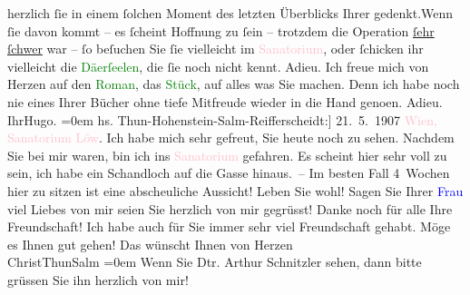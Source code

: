                herzlich ſie in einem ſolchen Moment des letzten Überblicks Ihrer gedenkt.\hspace*{1.5em}Wenn ſie davon kommt – es {\pb}ſcheint Hoffnung zu ſein –
               trotzdem die Operation \uline{ſehr}{ }\uline{ſchwer} war – ſo beſuchen Sie ſie
               vielleicht im \textcolor{pink}{Sanatorium}{}, oder
               ſchicken ihr vielleicht die \textcolor{green}{Dä{\geminationm}erſeelen}{}\ledrightnote{\textcolor{green}{Dämmerseelen. Novellen}}, die ſie noch nicht kennt.\pend
           \pstart
           Adieu. Ich freue mich von Herzen auf den \textcolor{green}{Roman}{}, das \textcolor{green}{Stück}{}, auf
               alles was Sie machen. {\pb}Denn ich
               habe noch nie eines Ihrer Bücher ohne tiefe Mitfreude wieder in die Hand geno{\geminationm}en.\pend
           \pstart
           Adieu.{\\[\baselineskip]}Ihr\spacefill\mbox{Hugo.}\pend
           \leftskip=0em{}{\bigskip}\pstart
           \raggedleft{}{\pb}{[}hs. Thun-Hohenstein-Salm-Reifferscheidt:{]} 21. 5. 1907\pend
           \pstart
           \raggedleft{}\textcolor{pink}{Wien, Sanatorium Löw}{}\ledrightnote{\textcolor{pink}{Sanatorium Loew}}.\pend
           \pstart
           Ich habe mich sehr gefreut, Sie heute noch zu sehen. Nachdem Sie bei mir waren, bin
               ich ins \textcolor{pink}{Sanatorium}{} gefahren. Es
               scheint hier sehr voll zu sein, {\kaufmannsund} ich habe ein
               Schandloch auf die Gasse hinaus. –\pend
           \pstart
           Im besten Fall 4 Wochen hier zu sitzen ist eine abscheuliche Aussicht!\pend
           \pstart
           Leben Sie wohl! Sagen Sie Ihrer \textcolor{blue}{Frau}{} viel Liebes von mir {\kaufmannsund} seien Sie herzlich
               von mir gegrüsst!\pend
           \pstart
           {\pb}Danke noch für alle Ihre
               Freundschaft! Ich habe auch für Sie immer sehr viel Freundschaft gehabt.\pend
           \pstart
           Möge es Ihnen gut gehen! Das wünscht Ihnen von
                  Herzen{\\[\baselineskip]}\spacefill\mbox{ChristThunSalm}\pend
           \leftskip=0em{}\pstart
           \noindent{}Wenn Sie Dtr. Arthur Schnitzler sehen, dann bitte grüssen Sie ihn herzlich von
                  mir!\pend
           \endnumbering{}  
      